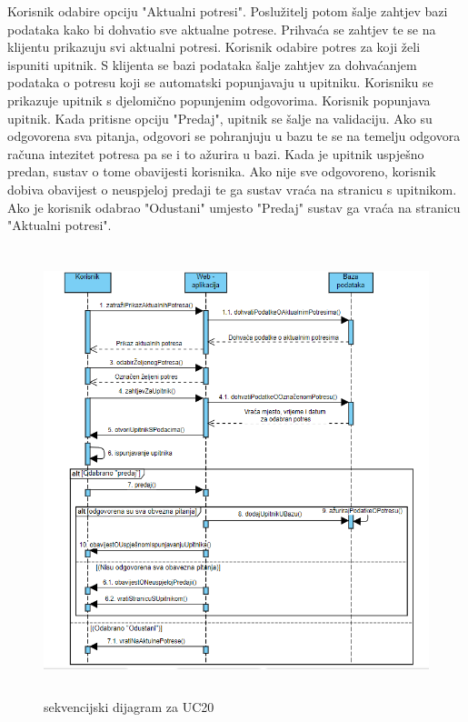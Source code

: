 			{Korisnik odabire opciju "Aktualni potresi". Poslužitelj potom šalje zahtjev bazi podataka kako bi dohvatio sve aktualne potrese. Prihvaća se zahtjev te se na klijentu prikazuju svi aktualni potresi. Korisnik odabire potres za koji želi ispuniti upitnik. S klijenta se bazi podataka šalje zahtjev za dohvaćanjem podataka o potresu koji se automatski popunjavaju u upitniku. Korisniku se prikazuje upitnik s djelomično popunjenim odgovorima. Korisnik popunjava upitnik. Kada pritisne opciju "Predaj", upitnik se šalje na validaciju. Ako su odgovorena sva pitanja, odgovori se pohranjuju u bazu te se na temelju odgovora računa intezitet potresa pa se i to ažurira u bazi. 
			Kada je upitnik uspješno predan, sustav o tome obavijesti korisnika. Ako nije sve odgovoreno, korisnik dobiva obavijest o neuspjeloj predaji te ga sustav vraća na stranicu s upitnikom. Ako je korisnik odabrao "Odustani" umjesto "Predaj" sustav ga vraća na stranicu "Aktualni potresi".}
			\begin{figure}[H]
				  \includegraphics[width=\textwidth, height=13cm]{slike/uc20.PNG}
				  \caption{sekvencijski dijagram za UC20}
				  \label{fig:sekvuc8} 
				 \end{figure}
				\eject
	
